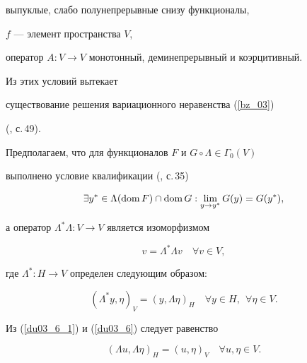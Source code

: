 выпуклые, слабо полунепрерывные снизу функционалы,


$f$ --- элемент пространства $V$,


оператор $A: V \to V$ монотонный, деминепрерывный и коэрцитивный. 


Из этих условий вытекает


существование решения вариационного неравенства (\ref{bz_03})


(\cite{ET_79}, с.\,49).





Предполагаем, что для функционалов $F$ и $G\circ \Lambda \in \Gamma_0 (V)$


выполнено условие квалификации (\cite{ET_79}, с.\,35)


\begin{equation} 


\exists y^* \in \Lambda (\dom F) \cap \dom G : 


\lim_{y \to y^*} G(y)=G(y^*),


\label{du03_G}


\end{equation}


а оператор $\Lambda^* \Lambda : V \to V $ является изоморфизмом


\begin{equation}


v=\Lambda^* \Lambda v \quad \forall v \in V ,


\label{du03_6_1}


\end{equation}


где $\Lambda^* : H \to V$ определен следующим образом:


\begin{equation}


(\Lambda^* y, \eta)_V=(y , \Lambda \eta)_H


 \quad \forall y \in H,\ \ \forall \eta \in V.


\label{du03_6}


\end{equation}


Из (\ref{du03_6_1}) и (\ref{du03_6}) следует равенство


\begin{equation}


(\Lambda u, \Lambda \eta)_H=(u, \eta)_V \quad \forall u , \eta \in V.


\label{du03_LAM}


\end{equation}





